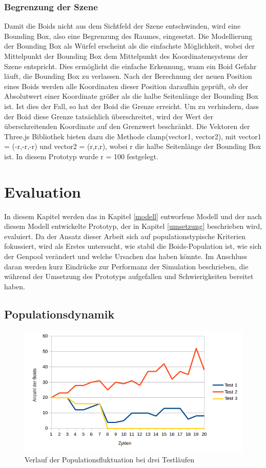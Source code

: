 \documentclass[draft=false
              ,paper=a4
              ,twoside=false
              ,fontsize=11pt
              ,headsepline
              ,BCOR10mm
              ,DIV11
              ,bibtotoc
              ,liststotoc
              ]{scrbook}
\begin{document}
\subsection{Begrenzung der Szene}\label{box}
Damit die Boids nicht aus dem Sichtfeld der Szene entschwinden, wird eine Bounding Box, also eine Begrenzung des Raumes, eingesetzt. Die Modellierung der Bounding Box als Würfel erscheint als die einfachste Möglichkeit, wobei der Mittelpunkt der Bounding Box dem Mittelpunkt des Koordinatensystems der Szene entspricht. Dies ermöglicht die einfache Erkennung, wann ein Boid Gefahr läuft, die Bounding Box zu verlassen. Nach der Berechnung der neuen Position eines Boids werden alle Koordinaten dieser Position daraufhin geprüft, ob der Absolutwert einer Koordinate größer als die halbe Seitenlänge der Bounding Box ist. Ist dies der Fall, so hat der Boid die Grenze erreicht. Um zu verhindern, dass der Boid diese Grenze tatsächlich überschreitet, wird der Wert der überschreitenden Koordinate auf den Grenzwert beschränkt. Die Vektoren der Three.js Bibliothek bieten dazu die Methode clamp(vector1, vector2), mit vector1 = (-r,-r,-r) und vector2 = (r,r,r), wobei r die halbe Seitenlänge der Bounding Box ist. In diesem Prototyp wurde r = 100 festgelegt.

\chapter{Evaluation}\label{eval}
In diesem Kapitel werden das in Kapitel \ref{modell} entworfene Modell und der nach diesem Modell entwickelte Prototyp, der in Kapitel \ref{umsetzung} beschrieben wird, evaluiert. Da der Ansatz dieser Arbeit sich auf populationstypische Kriterien fokussiert, wird als Erstes untersucht, wie stabil die Boids-Population ist, wie sich der Genpool verändert und welche Ursachen das haben könnte. Im Anschluss daran werden kurz Eindrücke zur Performanz der Simulation beschrieben, die während der Umsetzung des Prototyps aufgefallen und Schwierigkeiten bereitet haben.

\section{Populationsdynamik}
\begin{figure}[h]
\centering
\includegraphics[scale=0.8]{project/Test1-Populationen.png}
\caption{Verlauf der Populationsfluktuation bei drei Testläufen}
\label{populationsgrafik}
\end{figure}
\end{document}
